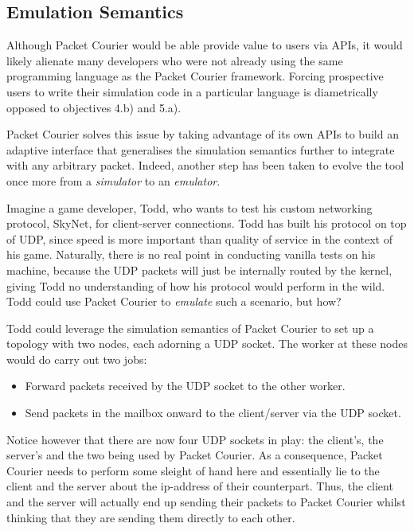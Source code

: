 \subsection{Emulation Semantics}\label{subsection:emulation_semantics}

Although Packet Courier would be able provide value to users via APIs, it would likely alienate many developers who
were not already using the same programming language as the Packet Courier framework. Forcing prospective users to
write their simulation code in a particular language is diametrically opposed to objectives 4.b) and 5.a).

Packet Courier solves this issue by taking advantage of its own APIs to build an adaptive interface that generalises
the simulation semantics further to integrate with any arbitrary packet. Indeed, another step has been taken to
evolve the tool once more from a \emph{simulator} to an \emph{emulator}.

Imagine a game developer, Todd, who wants to test his custom networking protocol, SkyNet, for client-server
connections. Todd has built his protocol on top of UDP, since speed is more important than quality of service in the
context of his game. Naturally, there is no real point in conducting vanilla tests on his machine, because the UDP
packets will just be internally routed by the kernel, giving Todd no understanding of how his protocol would perform
in the wild. Todd could use Packet Courier to \emph{emulate} such a scenario, but how?

Todd could leverage the simulation semantics of Packet Courier to set up a topology with two nodes, each adorning a UDP
socket. The worker at these nodes would do carry out two jobs:
\begin{itemize}
    \item Forward packets received by the UDP socket to the other worker.
    \item Send packets in the mailbox onward to the client/server via the UDP socket.
\end{itemize}

Notice however that there are now four UDP sockets in play: the client's, the server's and the two being used by
Packet Courier. As a consequence, Packet Courier needs to perform some sleight of hand here and essentially lie to
the client and the server about the ip-address of their counterpart. Thus, the client and the server will actually
end up sending their packets to Packet Courier whilst thinking that they are sending them directly to each other.

